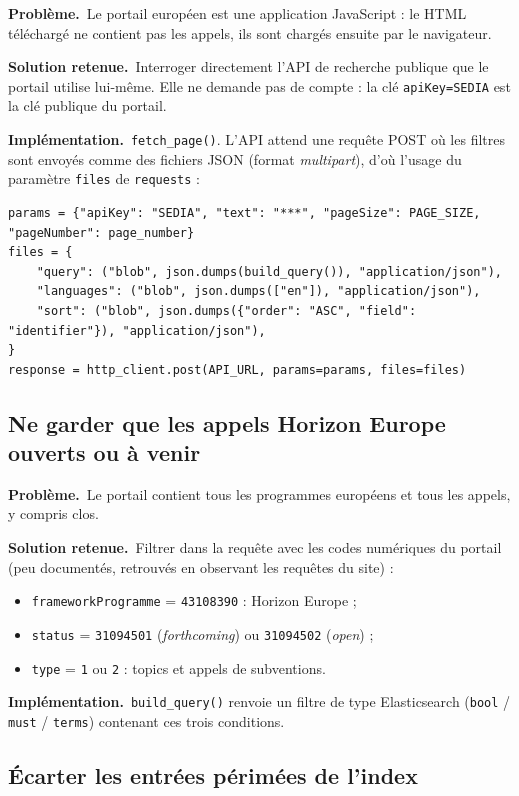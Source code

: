 \documentclass[11pt,a4paper]{article}
\newcommand{\pb}{\par\medskip\noindent\textbf{\textcolor{pbcolor}{Problème.}}\ }
\newcommand{\sol}{\par\medskip\noindent\textbf{\textcolor{solcolor}{Solution retenue.}}\ }
\newcommand{\impl}{\par\medskip\noindent\textbf{\textcolor{implcolor}{Implémentation.}}\ }
\newcommand{\code}[1]{\texttt{#1}}
\begin{document}
\pb Le portail européen est une application JavaScript : le HTML téléchargé ne contient
pas les appels, ils sont chargés ensuite par le navigateur.

\sol Interroger directement l'API de recherche publique que le portail utilise lui-même.
Elle ne demande pas de compte : la clé \code{apiKey=SEDIA} est la clé publique du portail.

\impl \code{fetch\_page()}. L'API attend une requête POST où les filtres sont envoyés comme
des \og fichiers \fg{} JSON (format \emph{multipart}), d'où l'usage du paramètre
\code{files} de \code{requests} :

\begin{lstlisting}
params = {"apiKey": "SEDIA", "text": "***", "pageSize": PAGE_SIZE, "pageNumber": page_number}
files = {
    "query": ("blob", json.dumps(build_query()), "application/json"),
    "languages": ("blob", json.dumps(["en"]), "application/json"),
    "sort": ("blob", json.dumps({"order": "ASC", "field": "identifier"}), "application/json"),
}
response = http_client.post(API_URL, params=params, files=files)
\end{lstlisting}

\subsection{Ne garder que les appels Horizon Europe ouverts ou à venir}

\pb Le portail contient tous les programmes européens et tous les appels, y compris clos.

\sol Filtrer dans la requête avec les codes numériques du portail (peu documentés,
retrouvés en observant les requêtes du site) :
\begin{itemize}
  \item \code{frameworkProgramme} = \code{43108390} : Horizon Europe ;
  \item \code{status} = \code{31094501} (\emph{forthcoming}) ou \code{31094502} (\emph{open}) ;
  \item \code{type} = \code{1} ou \code{2} : topics et appels de subventions.
\end{itemize}

\impl \code{build\_query()} renvoie un filtre de type Elasticsearch (\code{bool} /
\code{must} / \code{terms}) contenant ces trois conditions.

\subsection{Écarter les entrées périmées de l'index}
\end{document}
